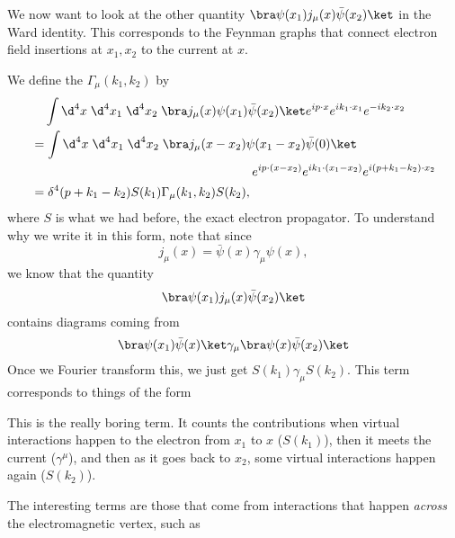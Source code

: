 \documentclass[a4paper]{article}
\begin{document}
We now want to look at the other quantity $\bra \psi(x_1) j_\mu(x) \bar\psi(x_2)\ket$ in the Ward identity. This corresponds to the Feynman graphs that connect electron field insertions at $x_1, x_2$ to the current at $x$.

We define the  $\Gamma_\mu(k_1, k_2)$ by
\begin{align*}
  &\hphantom{={}}\int \d^4 x\; \d^4 x_1\; \d^4 x_2\; \bra j_\mu(x) \psi(x_1) \bar\psi(x_2)\ket e^{ip\cdot x} e^{ik_1 \cdot x_1} e^{-ik_2 \cdot x_2}\\
  &= \int \d^4 x\; \d^4 x_1\; \d^4 x_2\; \bra j_\mu (x - x_2) \psi(x_1 - x_2) \bar\psi(0) \ket\\
  &\hphantom{\int \d^4 x\; \d^4 x_1\; \d^4 x_2\; hereissomespacefi} e^{ip\cdot (x - x_2)} e^{ik_1 \cdot (x_1 - x_2)} e^{i(p + k_1 - k_2)\cdot x_2}\\
  &= \delta^4(p + k_1 - k_2) S(k_1) \Gamma_\mu(k_1, k_2) S(k_2),
\end{align*}
where $S$ is what we had before, the exact electron propagator. To understand why we write it in this form, note that since
\[
  j_\mu(x) = \bar\psi(x) \gamma_\mu \psi(x),
\]
we know that the quantity
\[
  \bra \psi(x_1) j_\mu(x) \bar\psi(x_2)\ket
\]
contains diagrams coming from
\[
  \bra \psi(x_1) \bar\psi(x)\ket \gamma_\mu \bra \psi(x) \bar\psi(x_2)\ket
\]
Once we Fourier transform this, we just get $S(k_1) \gamma_\mu S(k_2)$. This term corresponds to things of the form
\begin{center}
\end{center}
This is the really boring term. It counts the contributions when virtual interactions happen to the electron from $x_1$ to $x$ ($S(k_1)$), then it meets the current ($\gamma^\mu$), and then as it goes back to $x_2$, some virtual interactions happen again ($S(k_2)$).

The interesting terms are those that come from interactions that happen \emph{across} the electromagnetic vertex, such as
\end{document}
